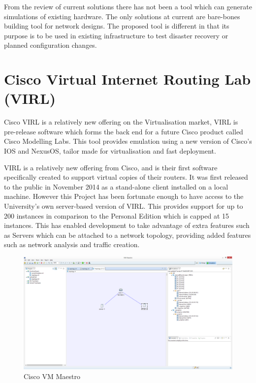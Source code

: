 \documentclass[11pt]{report}
\begin{document}
From the review of current solutions there has not been a tool which can generate simulations of existing hardware. The only solutions at current are bare-bones building tool for network designs. The proposed tool is different in that its purpose is to be used in existing infrastructure to test disaster recovery or planned configuration changes.

\section{Cisco Virtual Internet Routing Lab (VIRL)}

Cisco VIRL is a relatively new offering on the Virtualisation market, VIRL is pre-release software which forms the back end for a future Cisco product called Cisco Modelling Labs. This tool provides emulation using a new version of Cisco’s IOS and NexusOS, tailor made for virtualisation and fast deployment.

VIRL is a relatively new offering from Cisco, and is their first software specifically created to support virtual copies of their routers. It was first released to the public in November 2014 as a stand-alone client installed on a local machine. However this Project has been fortunate enough to have access to the University's own server-based version of VIRL. This provides support for up to 200 instances in comparison to the Personal Edition which is capped at 15 instances. This has enabled development to take advantage of extra features such as Servers which can be attached to a network topology, providing added features such as network analysis and traffic creation.

\begin{figure}[h!]
	\caption{Cisco VM  Maestro}
	\centering
	\includegraphics[width=1\textwidth]{VIRL.png}
\end{figure}
\end{document}
